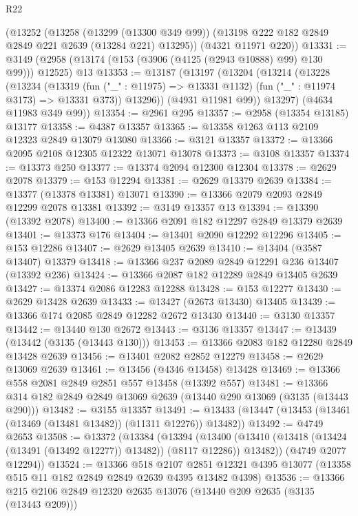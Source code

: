 \begin{lexlean}{R22}
\begin{coremodule}
    (@13252
      (@13258
        (@13299 (@13300 @349 @99))
        (@13198 @222 @182 @2849 @2849 @221 @2639 (@13284 @221) @13295))
      (@4321 @11971 @220))
@13331 := @3149 (@2958 (@13174 (@153 (@3906 (@4125 (@2943 @10888) @99) @130 @99))) @12525) @13
@13353 := @13187
    (@13197
      (@13204
        (@13214
          (@13228
            (@13234
              (@13319
                (fun ("_" : @11975) => @13331 @1132)
                (fun ("_" : @11974 @3173) => @13331 @373))
              @13296))
          (@4931 @11981 @99))
        @13297)
      (@4634 @11983 @349 @99))
@13354 := @2961 @295
@13357 := @2958 (@13354 @13185) @13177
@13358 := @4387 @13357
@13365 := @13358 @1263 @113 @2109 @12323 @2849 @13079 @13080
@13366 := @3121 @13357
@13372 := @13366 @2095 @2108 @12305 @12322 @13071 @13078
@13373 := @3108 @13357
@13374 := @13373 @250
@13377 := @13374 @2094 @12300 @12304
@13378 := @2629 @2078
@13379 := @153 @12294
@13381 := @2629 @13379 @2639
@13384 := @13377 (@13378 @13381) @13071
@13390 := @13366 @2079 @2093 @2849 @12299 @2078 @13381
@13392 := @3149 @13357 @13
@13394 := @13390 (@13392 @2078)
@13400 := @13366 @2091 @182 @12297 @2849 @13379 @2639
@13401 := @13373 @176
@13404 := @13401 @2090 @12292 @12296
@13405 := @153 @12286
@13407 := @2629 @13405 @2639
@13410 := @13404 (@3587 @13407) @13379
@13418 := @13366 @237 @2089 @2849 @12291 @236 @13407 (@13392 @236)
@13424 := @13366 @2087 @182 @12289 @2849 @13405 @2639
@13427 := @13374 @2086 @12283 @12288
@13428 := @153 @12277
@13430 := @2629 @13428 @2639
@13433 := @13427 (@2673 @13430) @13405
@13439 := @13366 @174 @2085 @2849 @12282 @2672 @13430
@13440 := @3130 @13357
@13442 := @13440 @130 @2672
@13443 := @3136 @13357
@13447 := @13439 (@13442 (@3135 (@13443 @130)))
@13453 := @13366 @2083 @182 @12280 @2849 @13428 @2639
@13456 := @13401 @2082 @2852 @12279
@13458 := @2629 @13069 @2639
@13461 := @13456 (@4346 @13458) @13428
@13469 := @13366 @558 @2081 @2849 @2851 @557 @13458 (@13392 @557)
@13481 := @13366 @314 @182 @2849 @2849 @13069 @2639 (@13440 @290 @13069 (@3135 (@13443 @290)))
@13482 := @3155 @13357
@13491 := @13433 (@13447 (@13453 (@13461 (@13469 (@13481 @13482)) (@11311 @12276)) @13482))
@13492 := @4749 @2653
@13508 := @13372
    (@13384
      (@13394
        (@13400 (@13410 (@13418 (@13424 (@13491 (@13492 @12277)) @13482)) (@8117 @12286)) @13482))
      (@4749 @2077 @12294))
@13524 := @13366
    @518
    @2107
    @2851
    @12321
    @4395
    @13077
    (@13358 @515 @11 @182 @2849 @2849 @2639 @4395 @13482 @4398)
@13536 := @13366 @215 @2106 @2849 @12320 @2635 @13076 (@13440 @209 @2635 (@3135 (@13443 @209)))

\end{coremodule}
\end{lexlean}
